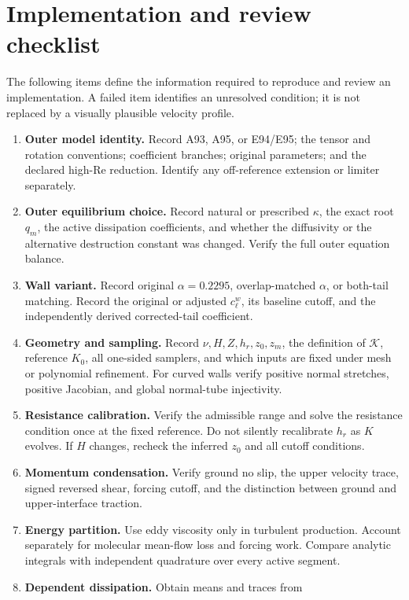 \documentclass[11pt,a4paper]{article}
\numberwithin{equation}{section}
\begin{document}
\section{Implementation and review checklist}
\label{app:checklist}

The following items define the information required to reproduce and
review an implementation. A failed item identifies an unresolved
condition; it is not replaced by a visually plausible velocity profile.

\begin{enumerate}
\item \textbf{Outer model identity.} Record A93, A95, or E94/E95;
the tensor and rotation conventions; coefficient branches; original
parameters; and the declared high-Re reduction. Identify any
off-reference extension or limiter separately.
\item \textbf{Outer equilibrium choice.} Record natural or prescribed
$\kappa$, the exact root $q_m$, the active dissipation coefficients,
and whether the diffusivity or the alternative destruction constant
was changed. Verify the full outer equation balance.
\item \textbf{Wall variant.} Record original $\alpha=0.2295$,
overlap-matched $\alpha$, or both-tail matching. Record the original
or adjusted $c_\ell^w$, its baseline cutoff, and the independently
derived corrected-tail coefficient.
\item \textbf{Geometry and sampling.} Record $\nu,H,Z,h_r,z_0,z_m$,
the definition of $\mathcal K$, reference $K_0$, all one-sided
samplers, and which inputs are fixed under mesh or polynomial
refinement. For curved walls verify positive normal stretches,
positive Jacobian, and global normal-tube injectivity.
\item \textbf{Resistance calibration.} Verify the admissible range
and solve the resistance condition once at the fixed reference.
Do not silently recalibrate $h_r$ as $K$ evolves. If $H$ changes,
recheck the inferred $z_0$ and all cutoff conditions.
\item \textbf{Momentum condensation.} Verify ground no slip, the
upper velocity trace, signed reversed shear, forcing cutoff,
and the distinction between ground and upper-interface traction.
\item \textbf{Energy partition.} Use eddy viscosity only in
turbulent production. Account separately for molecular mean-flow
loss and forcing work. Compare analytic integrals with independent
quadrature over every active segment.
\item \textbf{Dependent dissipation.} Obtain means and traces from

\end{enumerate}
\end{document}
